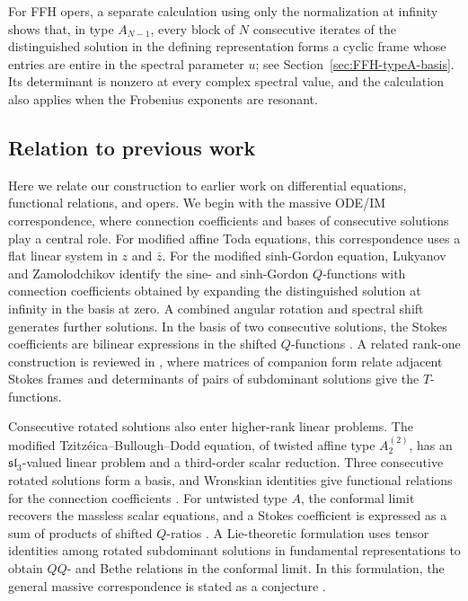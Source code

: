 \documentclass[11pt,leqno]{amsart}
\numberwithin{equation}{section}
\theoremstyle{plain}
\theoremstyle{definition}
\theoremstyle{plain}
\theoremstyle{definition}
\theoremstyle{remark}
\begin{document}
For FFH opers, a separate calculation using only the normalization at infinity shows that, in type $A_{N-1}$, every block of $N$ consecutive iterates of the distinguished solution in the defining representation forms a cyclic frame whose entries are entire in the spectral parameter $u$; see Section~\ref{sec:FFH-typeA-basis}.  Its determinant is nonzero at every complex spectral value, and the calculation also applies when the Frobenius exponents are resonant.

\subsection{Relation to previous work}

Here we relate our construction to earlier work on differential equations, functional relations, and opers.  We begin with the massive ODE/IM correspondence, where connection coefficients and bases of consecutive solutions play a central role.  For modified affine Toda equations, this correspondence uses a flat linear system in $z$ and $\bar z$. For the modified sinh-Gordon equation, Lukyanov and Zamolodchikov identify the sine- and sinh-Gordon $Q$-functions with connection coefficients obtained by expanding the distinguished solution at infinity in the basis at zero. A combined angular rotation and spectral shift generates further solutions. In the basis of two consecutive solutions, the Stokes coefficients are bilinear expressions in the shifted $Q$-functions \cite[Sections~2--4]{LukyanovZamolodchikov2010}. A related rank-one construction is reviewed in \cite[Sections~4.4--4.6]{DDNT2020}, where matrices of companion form relate adjacent Stokes frames and determinants of pairs of subdominant solutions give the $T$-functions.

Consecutive rotated solutions also enter higher-rank linear problems.  The modified Tzitz\'eica--Bullough--Dodd equation, of twisted affine type $A_2^{(2)}$, has an $\mathfrak{sl}_3$-valued linear problem and a third-order scalar reduction. Three consecutive rotated solutions form a basis, and Wronskian identities give functional relations for the connection coefficients \cite[Sections~2 and~4]{DFNT2013}. For untwisted type $A$, the conformal limit recovers the massless scalar equations, and a Stokes coefficient is expressed as a sum of products of shifted $Q$-ratios \cite[Sections~3.2 and~4.2--4.3]{AdamopoulouDunning2014}. A Lie-theoretic formulation uses tensor identities among rotated subdominant solutions in fundamental representations to obtain $QQ$- and Bethe relations in the conformal limit. In this formulation, the general massive correspondence is stated as a conjecture \cite[Sections~3--5]{ItoLocke2015}.
\end{document}

